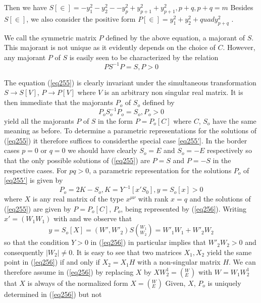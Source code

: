 Then we have 
$ S [\in] = - y^2_1 - y^2_2 -- y^2_p + y^2_{p +1 } + y^2_{p +1
} , p + q, p + q = m $ Besides $S[\in]$, we also consider the
positive form $P [\in ] = y^2_1+ y^2_2 + quad y^2_{p +q }$ .  

We call the symmetric matrix $P$ defined by the above equation, a
majorant of $S$. This majorant is not unique as it evidently depends
on the choice of $C$. However, any majorant $P$ of $S$ is easily seen
to be characterized by the relation  
\begin{equation*}
PS^{ -1} P = S , P > 0 \tag{255}\label{eq255}
\end{equation*}

The equation (\ref{eq255}) is clearly invariant under the simultaneous
transformation $S \to S[V]$, $P \to P[V] $ where $V$ is an arbitrary non
singular real matrix. It is then immediate that the majorants $P_o$ of
$S_o$ defined by  
\begin{equation*}
P_o S_o^{ -1} P_o = S_o, P_o > 0 \tag*{$(255')$}\label{eq255'}
\end{equation*}
yield all the majorants $P$ of $S$ in the form $P = P _o [C]$ where $C$,
$S_o$ have the same meaning as before. To determine a parametric
representations for the solutions of (\ref{eq255}) it therefore suffices to
consider\pageoriginale the special case \ref{eq255'}. In the border
cases $p = 0 $ or $q 
= 0 $ we should have clearly $S_o = E$ and $S_o = -E$ respectively so
that the only possible solutions of (\ref{eq255}) are $P = S$ and $P = -S$
in the respective cases. For $pq > 0$, a parametric representation for
the solutions $P_o$ of \ref{eq255'} is given by  
\begin{equation*}
P_o = 2K - S_o, K = Y ^{-1}[x' S_0], y = S_o [x] > 0\tag{256}\label{eq256}
\end{equation*}
where $X$ is any real matrix of the type $x^{ \mu \nu}$ with rank $x =
q$ and the solutions of (\ref{eq255}) are given by $P = P_o [C]$, $P_o$, being
represented by (\ref{eq256}). Writing $x ' = (W_1   W_1)$ with and 
we observe that  
$$
y = S_o [X] = ( W', W'_2) S (^{W_1} _{W_2}) = W'_1W_1 +W'_2 W_2 
$$
so that the condition $Y > 0$ in (\ref{eq256}) in particular implies that $
W'_2 W_2 > 0$ and consequently $|W_2| \neq 0$. It is easy to see that
two matrices $X_1 , X_2$ yield the same point in (\ref{eq256}) if and only if 
$X_2 = X_1 H$ with a non-singular matrix $H$. We can
therefore assume in (\ref{eq256}) by replacing $X$ by $X W^1_2 = (^W_E)$
with $W = W_1W^1_2$ that $X$ is always of the normalized form $X =
(^W_E)$ Given, $X$, $P_o$ is uniquely determined in (\ref{eq256}) but not
